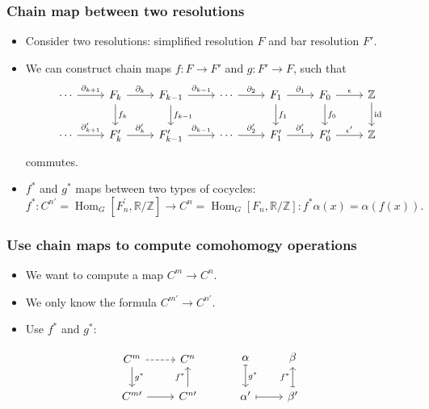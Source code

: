 \documentclass[xcolor=table, aspectratio=169]{beamer}
\newcommand{\uone}{\mathbb R/\mathbb Z}
\DeclareMathOperator{\hhom}{Hom}
\DeclareMathOperator{\id}{id}
\begin{document}
\begin{frame}[fragile]
	\frametitle{Chain map between two resolutions}
	\begin{itemize}
		\item Consider two resolutions: simplified resolution $F$ and bar resolution $F'$.
		\item We can construct chain maps $f:F\rightarrow F'$ and $g:F'\rightarrow F$, such that
		\[\begin{tikzcd}
		\cdots\arrow[r,"\partial_{k+1}"]&
		F_k\arrow[r,"\partial_k"]\arrow[d,"f_k"]&
		F_{k-1}\arrow[r,"\partial_{k-1}"]\arrow[d,"f_{k-1}"]&
		\cdots\arrow[r,"\partial_2"]&
		F_1\arrow[r,"\partial_1"]\arrow[d,"f_1"]&
		F_0\arrow[r,"\epsilon"]\arrow[d,"f_0"]&
		\mathbb Z\arrow[d,"\id"]\\
		\cdots\arrow[r,"\partial_{k+1}'"]&
		F_k'\arrow[r,"\partial_k'"]&
		F_{k-1}'\arrow[r,"\partial_{k-1}"]&
		\cdots\arrow[r,"\partial_2'"]&
		F_1'\arrow[r,"\partial_1'"]&
		F_0'\arrow[r,"\epsilon'"]&
		\mathbb Z
		\end{tikzcd}\]
		commutes.
		\item $f^\ast$ and $g^\ast$ maps between two types of cocycles:
		\[f^\ast:C^{n\prime} = \hhom_G[F^\prime_n,\uone]\rightarrow C^n=\hhom_G[F_n,\uone]:
		f^\ast\alpha(x)=\alpha(f(x)).\]
	\end{itemize}
\end{frame}

\begin{frame}[fragile]
	\frametitle{Use chain maps to compute comohomogy operations}
	\begin{itemize}
		\item We want to compute a map $C^m\rightarrow C^n$.
		\item We only know the formula $C^{m\prime}\rightarrow C^{n\prime}$.
		\item Use $f^\ast$ and $g^\ast$:
	\end{itemize}
	\[\begin{tikzcd}
		C^m\arrow[r,dashrightarrow]\arrow[d,"g^\ast"] & C^n\\
		C^{m\prime}\arrow[r] & C^{n\prime}\arrow[u,"f^\ast"]
	\end{tikzcd}\quad\quad\quad
	\begin{tikzcd}
		\alpha\arrow[d,"g^\ast",mapsto] & \beta\\
		\alpha'\arrow[r,mapsto] & \beta'\arrow[u,"f^\ast",mapsto]
	\end{tikzcd}
	\]
\end{frame}
\end{document}
